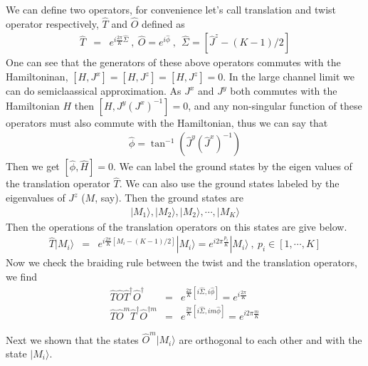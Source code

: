 \documentclass[reprint,prb,superscriptaddress]{revtex4-2}
\begin{document}
\par We can define two operators, for convenience let's call translation and twist operator respectively, $\hat{T}$ and $\hat{O}$ defined as 
\begin{eqnarray}
\hat{T} &=& e^{i\frac{2\pi}{K} \hat{\Sigma}} ~,~\hat{O} = e^{i\hat{\phi}}~,~~\hat{\Sigma}=[\hat{J}^z-(K-1)/2]
\end{eqnarray}
One can see that the generators of these above operators commutes with the Hamiltoninan, $[H,J^x]=[H,J^z]=[H,J^z]=0$. In the large channel limit we can do semiclaassical approximation. As $J^x$ and $J^y$ both commutes with the Hamiltonian $H$ then $[H,J^y{(J^{x})}^{-1}]=0$, and any non-singular function of these operators must also commute with the Hamiltonian, thus we can say that
\begin{eqnarray}
\hat{\phi}=\tan^{-1}(\hat{J}^y(\hat{J}^x)^{-1})
\end{eqnarray}
Then we get $[\hat{\phi},\hat{H}]=0$. We can label the ground states by the eigen values of the translation operator $\hat{T}$. We can also use the ground states labeled by the eigenvalues of $J^z$ ($M$, say). Then the ground states are 
\begin{eqnarray}
|M_1\rangle,|M_2\rangle,|M_2\rangle,\cdots ,|M_K\rangle
\end{eqnarray}
Then the operations of the translation operators on this states are give below.
\begin{eqnarray}
\hat{T}|M_i\rangle &=& e^{i\frac{2\pi}{K} [M_i-(K-1)/2]} |M_i\rangle = e^{i2\pi\frac{p_i}{K} } |M_i\rangle~,~p_i\in[1,\cdots,K]
\end{eqnarray}
Now we check the braiding rule between the twist and the translation operators, we find
\begin{eqnarray}
\hat{T}\hat{O}\hat{T}^{\dagger}\hat{O}^{\dagger} &=& e^{\frac{2\pi }{K}[i\hat{\Sigma},i\hat{\phi}]}=e^{i\frac{2\pi }{K}} \nonumber\\
\hat{T}\hat{O}^m\hat{T}^{\dagger}\hat{O}^{\dagger m} &=& e^{\frac{2\pi }{K}[i\hat{\Sigma},im\hat{\phi}]}=e^{i2\pi \frac{m}{K}}
\end{eqnarray}

Next we shown that the states $\hat{O}^m |M_i\rangle$ are orthogonal to each other and with the state $|M_i\rangle$.
\end{document}
